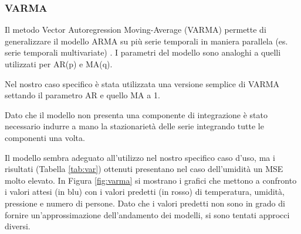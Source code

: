 \documentclass{article}
\begin{document}
\subsubsection{VARMA}
Il metodo Vector Autoregression Moving-Average (VARMA) permette di generalizzare il modello ARMA su più serie temporali in maniera parallela (es. serie temporali multivariate) \cite{varma}. I parametri del modello sono analoghi a quelli utilizzati per AR(p) e MA(q). 

Nel nostro caso specifico è stata utilizzata una versione semplice di VARMA settando il parametro AR e quello MA a 1.

Dato che il modello non presenta una componente di integrazione è stato necessario indurre a mano la stazionarietà delle serie integrando tutte le componenti una volta. 

Il modello sembra adeguato all'utilizzo nel nostro specifico caso d'uso, ma i risultati (Tabella \ref{tab:var}) ottenuti presentano nel caso dell'umidità un MSE molto elevato. In Figura \ref{fig:varma} si mostrano i grafici che mettono a confronto i valori attesi (in blu) con i valori predetti (in rosso) di temperatura, umidità, pressione e numero di persone. Dato che i valori predetti non sono in grado di fornire un'approssimazione dell'andamento dei modelli, si sono tentati approcci diversi.
\end{document}
